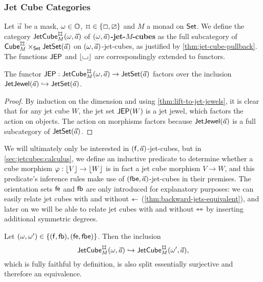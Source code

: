 \documentclass[a4paper]{memoir}
\begin{document}
\subsubsection{Jet Cube Categories}
\begin{definition} \label{def:jet-cube-cat}
	Let $\vec a$ be a mask, $\omega \in {\mathbb{O}}$, $\mycubex \in \accol{\affine, \cartes}$ and $M$ a monad on ${\mathsf{Set}}$.
	We define
	the category $\jetcube{\myorix}{\mycubex}{M}{\vec a}$ of \textbf{$(\omega, \vec a)$-jet-$M$-cubes}
	as the full subcategory of $\cubecat^\mycubex_M \times_\Set \jetset{\vec a}$ on $(\omega, \vec a)$-jet-cubes, as justified by \cref{thm:jet-cube-pullback}.
	The functions $\mathsf{JEP}$ and $\mathopen{}\left\lfloor {\llcorner\hspace{-.4ex}\lrcorner} \right\rfloor\mathclose{}$ are correspondingly extended to functors.
\end{definition}
\begin{corollary} \label{thm:jet-cubes-are-jewels}
	The functor $\JEP : \jetcube{\myorix}{\mycubex}{M}{\vec a} \to \jetset{\vec a}$ factors over the inclusion $\mathsf{JetJewel}(\vec a) \hookrightarrow \mathsf{JetSet}(\vec a)$.
\end{corollary}
\begin{proof}
	By induction on the dimension and using \cref{thm:lift-to-jet-jewels}, it is clear that for any jet cube $W$, the jet set $\mathsf{JEP}(W)$ is a jet jewel, which factors the action on objects. The action on morphisms factors because $\mathsf{JetJewel}(\vec a)$ is a full subcategory of $\mathsf{JetSet}(\vec a)$.
\end{proof}
We will ultimately only be interested in $({\mathsf{f}}, \vec a)$-jet-cubes, but in \cref{sec:jetcubes:calculus}, we define an inductive predicate to determine whether a cube morphism $\varphi : \mathopen{}\left\lfloor V \right\rfloor\mathclose{} \to \mathopen{}\left\lfloor W \right\rfloor\mathclose{}$ is in fact a jet cube morphism $V \to W$, and this predicate's inference rules make use of $({\mathsf{fbe}}, \vec a)$-jet-cubes in their premises.
The orientation sets ${\mathsf{fe}}$ and ${\mathsf{fb}}$ are only introduced for explanatory purposes: we can easily relate jet cubes with and without $\leftarrowtriangle$ (\cref{thm:backward-jets-equivalent}), and later on we will be able to relate jet cubes with and without $\leftrightarrowtriangle$ by inserting additional symmetric degrees.
\begin{proposition} \label{thm:backward-jets-equivalent}
	Let $(\omega, \omega') \in \mathopen{}\left\{ ({\mathsf{f}}, {\mathsf{fb}}), ({\mathsf{fe}}, {\mathsf{fbe}}) \right\}\mathclose{}$.
	Then the inclusion
	\[
		\jetcube{\myorix}{\mycubex}{M}{\vec a} \hookrightarrow \jetcube{\myorix'}{\mycubex}{M}{\vec a},
	\]
	which is fully faithful by definition, is also split essentially surjective and therefore an equivalence.
\end{proposition}
\end{document}
